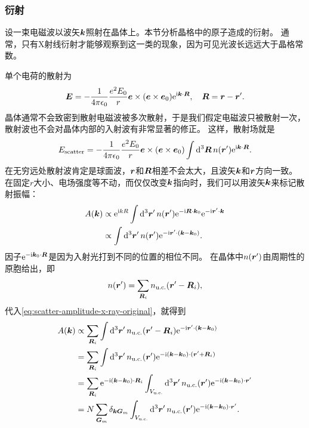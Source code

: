 \subsubsection{衍射}

设一束电磁波以波矢$\vb*{k}$照射在晶体上。本节分析晶格中的原子造成的衍射。
通常，只有X射线衍射才能够观察到这一类的现象，因为可见光波长远远大于晶格常数。

单个电荷的散射为
\begin{equation}
    \vb*{E} = -\frac{1}{4\pi \epsilon_0} \frac{e^2 E_0}{r} \vb*{e} \times (\vb*{e} \times \vb*{e}_0) \mathrm{e}^{\mathrm{i} \vb*{k} \cdot \vb*{R}}, \quad \vb*{R} = \vb*{r} - \vb*{r}'.
\end{equation}
晶体通常不会致密到散射电磁波被多次散射，于是我们假定电磁波只被散射一次，散射波也不会对晶体内部的入射波有非常显著的修正。
这样，散射场就是
\begin{equation}
    E_\text{scatter} = -\frac{1}{4\pi \epsilon_0} \frac{e^2 E_0}{r} \vb*{e} \times (\vb*{e} \times \vb*{e}_0) \int \dd[3]{\vb*{R}} n(\vb*{r}') \mathrm{e}^{\mathrm{i} \vb*{k} \cdot \vb*{R}}.
\end{equation}
在无穷远处散射波肯定是球面波，$\vb*{r}$和$\vb*{R}$相差不会太大，且波矢$\vb*{k}$和$\vb*{r}$方向一致。
在固定$r$大小、电场强度等不动，而仅仅改变$\vb*{k}$指向时，我们可以用波矢$\vb*{k}$来标记散射振幅：
\begin{equation}
    \begin{aligned}
        A(\vb*{k}) &\propto \mathrm{e}^{\mathrm{i} k R} \int \dd[3]{\vb*{r}'} n(\vb*{r}') \mathrm{e}^{- \mathrm{i} \vb*{R} \cdot \vb*{k}_0} \mathrm{e}^{- \mathrm{i} \vb*{r}' \cdot \vb*{k}} \\
        &\propto \int \dd[3]{\vb*{r}'} n(\vb*{r}') \mathrm{e}^{- \mathrm{i} \vb*{r}' \cdot (\vb*{k} - \vb*{k}_0)}.
    \end{aligned}
    \label{eq:scatter-amplitude-x-ray-original}
\end{equation}
因子$\mathrm{e}^{- \mathrm{i} \vb*{k}_0 \cdot \vb*{R}}$是因为入射光打到不同的位置的相位不同。
在晶体中$n(\vb*{r}')$由周期性的原胞给出，即
\begin{equation}
    n(\vb*{r}') = \sum_{\vb*{R}_i} n_\text{u.c.}(\vb*{r}' - \vb*{R}_i),
\end{equation}
代入\eqref{eq:scatter-amplitude-x-ray-original}，就得到
\[
    \begin{aligned}
        A(\vb*{k}) &\propto \sum_{\vb*{R}_i} \int \dd[3]{\vb*{r}'} n_\text{u.c.}(\vb*{r}' - \vb*{R}_i) \mathrm{e}^{-\mathrm{i} \vb*{r}' \cdot (\vb*{k} - \vb*{k}_0)} \\
        &= \sum_{\vb*{R}_i} \int \dd[3]{\vb*{r}'} n_\text{u.c.}(\vb*{r}') \mathrm{e}^{-\mathrm{i} (\vb*{k} - \vb*{k}_0) \cdot (\vb*{r}' + \vb*{R}_i)} \\
        &= \sum_{\vb*{R}_i} \mathrm{e}^{-\mathrm{i} (\vb*{k} - \vb*{k}_0) \cdot \vb*{R}_i} \int_{V_{\text{u.c.}}} \dd[3]{\vb*{r}'} n_\text{u.c.}(\vb*{r}') \mathrm{e}^{-\mathrm{i} (\vb*{k} - \vb*{k}_0) \cdot \vb*{r}'} \\
        &= N \sum_{\vb*{G}_m} \delta_{\vb*{k} \vb*{G}_m} \int_{V_{\text{u.c.}}} \dd[3]{\vb*{r}'} n_\text{u.c.}(\vb*{r}') \mathrm{e}^{-\mathrm{i} (\vb*{k} - \vb*{k}_0) \cdot \vb*{r}'}.
    \end{aligned}
\]
